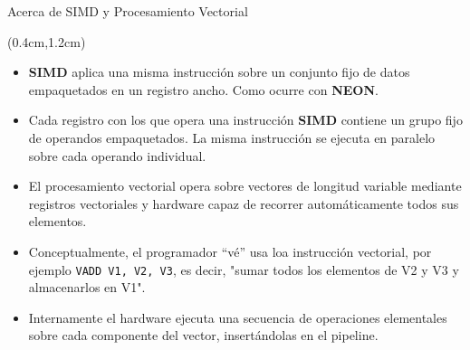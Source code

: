 \begin{frame}{Acerca de SIMD y Procesamiento Vectorial}
 \begin{textblock*}{\textwidth}(0.4cm,1.2cm)
  \begin{tcolorbox}[enhanced jigsaw,rounded corners, drop fuzzy shadow=ShadowColor]
   \begin{itemize}[<+->]\justifying
    \item \textbf{SIMD} aplica una misma instrucción sobre un conjunto fijo de datos empaquetados en un registro ancho. Como ocurre con \textbf{NEON}.
    \item Cada registro con los que opera una instrucción \textbf{SIMD} contiene un grupo fijo de operandos empaquetados. La misma instrucción se ejecuta en paralelo sobre cada operando individual.
    \item El procesamiento vectorial opera sobre vectores de longitud variable mediante registros vectoriales y hardware capaz de recorrer automáticamente todos sus elementos.
    \item Conceptualmente, el programador ``vé'' usa loa instrucción vectorial, por ejemplo \texttt{VADD V1, V2, V3}, es decir, "sumar todos los elementos de V2 y V3 y almacenarlos en V1".
    \item Internamente el hardware ejecuta una secuencia de operaciones elementales sobre cada componente del vector, insertándolas en el pipeline.
   \end{itemize}
  \end{tcolorbox}
 \end{textblock*}
\end{frame}


